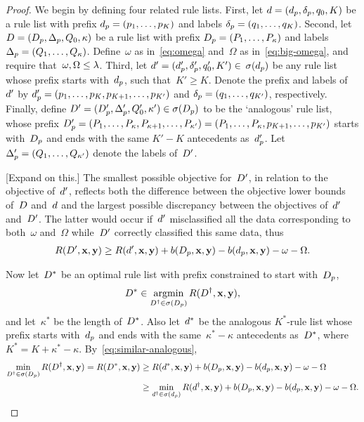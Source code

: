 \begin{arxiv}
\begin{proof}
We begin by defining four related rule lists.
%
First, let ${{d} = (d_p, \delta_p, q_0, K)}$
be a rule list with prefix ${d_p = (p_1, \dots, p_K)}$
and labels ${\delta_p = (q_1, \dots, q_K)}$.
%
Second, let ${{D} = (D_p, \Delta_p, Q_0, \kappa)}$
be a rule list with prefix ${D_p = (P_1, \dots, P_\kappa)}$
and labels ${\Delta_p = (Q_1, \dots, Q_\kappa)}$.
%
Define~$\omega$ as in~\eqref{eq:omega}
and~$\Omega$ as in~\eqref{eq:big-omega},
and require that~${\omega, \Omega \le {\lambda}}$.
%
Third, let ${{d}' = (d_p', \delta_p', q_0', K') \in}$
${\sigma(d_p)}$ be any rule list
whose prefix starts with~$d_p$, such that~${K' \ge K}$.
%
Denote the prefix and labels of~${d}'$ by
${d_p' = (p_1, \dots, p_K, p_{K+1}, \dots, p_{K'})}$
and ${\delta_p = (q_1, \dots, q_{K'})}$,
respectively.
%
Finally, define
${{D}' = (D_p', \Delta_p', Q_0', \kappa') \in \sigma(D_p)}$
to be the `analogous' rule list, \ie whose prefix
${D_p' = (P_1, \dots, P_\kappa, P_{\kappa+1}, \dots, P_{\kappa'})
= (P_1, \dots, P_\kappa, p_{K+1}, \dots, p_{K'})}$
starts with~$D_p$ and ends with the same ${K'-K}$
antecedents as~$d_p'$.
%
Let ${\Delta_p' = (Q_1, \dots, Q_{\kappa'})}$
denote the labels of~${D}'$.

[Expand on this.]
%
The smallest possible objective for~${D}'$, in relation
to the objective of~${d}'$, reflects both the difference
between the objective lower bounds of~${D}$ and~${d}$
and the largest possible discrepancy between the
objectives of~${d}'$ and~${D}'$.
%
The latter would occur if~${d}'$ misclassified all the data
corresponding to both~$\omega$ and~$\Omega$ while~${D}'$
correctly classified this same data, thus
\begin{align}
\Obj(\RLB', \x, \y) \ge \Obj(\RL', \x, \y)
  + b(\PrefixB, \x, \y) - b(\Prefix, \x, \y) - \omega - \Omega.
\label{eq:similar-analogous}
\end{align}
%

Now let~${D}^*$ be an optimal rule list with prefix
constrained to start with~$D_p$,
\begin{align}
\RLB^* \in \argmin_{\RLB^\dagger \in \StartsWith(\PrefixB)} \Obj(\RLB^\dagger, \x, \y),
\end{align}
and let~$\kappa^*$ be the length of~${D}^*$.
%
Also let~${d}^*$ be the analogous $K^*$-rule list whose prefix
starts with~$d_p$ and ends with the same~${\kappa^* - \kappa}$
antecedents as~${D}^*$, where~${K^* = K + \kappa^* - \kappa}$.
%
By~\eqref{eq:similar-analogous},
\begin{align}
\min_{\RLB^\dagger \in \StartsWith(\PrefixB)} \Obj(\RLB^\dagger, \x, \y)
= \Obj(\RLB^*, \x, \y) &\ge \Obj(\RL^*, \x, \y)
  + b(\PrefixB, \x, \y) - b(\Prefix, \x, \y) - \omega - \Omega \nn \\
&\ge \min_{\RL^\dagger \in \StartsWith(\Prefix)} \Obj(\RL^\dagger, \x, \y)
  + b(\PrefixB, \x, \y) - b(\Prefix, \x, \y) - \omega - \Omega.
\end{align}


\end{proof}
\end{arxiv}

